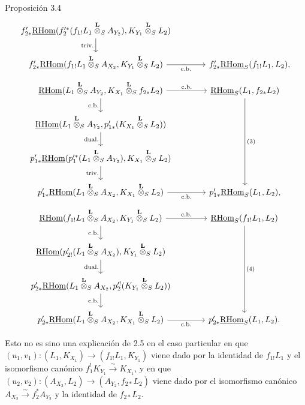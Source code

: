 \begin{statement}{Proposición 3.4}
\[\begin{tikzcd}[column sep=3.7em,row sep=1.7em]
f'_{2*}\uRHom(f_2'^*(f_{1!}L_1\overset{\mathbf L}{\otimes}_S A_{Y_2}),K_{Y_1}\overset{\mathbf L}{\otimes}_S L_2) \arrow[d,"\mathrm{triv.}"']
& \\
f'_{2*}\uRHom(f_{1!}L_1\overset{\mathbf L}{\otimes}_S A_{X_2},K_{Y_1}\overset{\mathbf L}{\otimes}_S L_2) \arrow[r,"\mathrm{c.b.}"']
& f'_{2*}\uRHom_S(f_{1!}L_1,L_2),
\end{tikzcd}
\]
\[
\begin{tikzcd}[column sep=3.7em,row sep=1.7em]
\uRHom(L_1\overset{\mathbf L}{\otimes}_S A_{Y_2},K_{X_1}\overset{\mathbf L}{\otimes}_S f_{2*}L_2)
  \arrow[r,"\mathrm{c.b.}"] \arrow[d,"\mathrm{c.b.}"']
& \uRHom_S(L_1,f_{2*}L_2) \arrow[ddd,"(3)"] \\
\uRHom(L_1\overset{\mathbf L}{\otimes}_S A_{Y_2},p'_{1*}(K_{X_1}\overset{\mathbf L}{\otimes}_S L_2)) \arrow[d,"\mathrm{dual.}"']
& \\
p'_{1*}\uRHom(p_1'^*(L_1\overset{\mathbf L}{\otimes}_S A_{Y_2}),K_{X_1}\overset{\mathbf L}{\otimes}_S L_2) \arrow[d,"\mathrm{triv.}"']
& \\
p'_{1*}\uRHom(L_1\overset{\mathbf L}{\otimes}_S A_{X_2},K_{X_1}\overset{\mathbf L}{\otimes}_S L_2) \arrow[r,"\mathrm{c.b.}"']
& p'_{1*}\uRHom_S(L_1,L_2),
\end{tikzcd}
\]
\[
\begin{tikzcd}[column sep=3.7em,row sep=1.7em]
\uRHom(f_{1!}L_1\overset{\mathbf L}{\otimes}_S A_{X_2},K_{Y_1}\overset{\mathbf L}{\otimes}_S L_2)
  \arrow[r,"\mathrm{c.b.}"] \arrow[d,"\mathrm{c.b.}"']
& \uRHom_S(f_{1!}L_1,L_2) \arrow[ddd,"(4)"] \\
\uRHom(p'_{2!}(L_1\overset{\mathbf L}{\otimes}_S A_{X_2}),K_{Y_1}\overset{\mathbf L}{\otimes}_S L_2) \arrow[d,"\mathrm{dual.}"']
& \\
p'_{2*}\uRHom(L_1\overset{\mathbf L}{\otimes}_S A_{X_2},p_2'^!(K_{Y_1}\overset{\mathbf L}{\otimes}_S L_2)) \arrow[d,"\mathrm{c.b.}"']
& \\
p'_{2*}\uRHom(L_1\overset{\mathbf L}{\otimes}_S A_{X_2},K_{X_1}\overset{\mathbf L}{\otimes}_S L_2) \arrow[r,"\mathrm{c.b.}"']
& p'_{2*}\uRHom_S(L_1,L_2).
\end{tikzcd}
\]
\end{statement}
Esto no es sino una explicación de 2.5 en el caso particular en que $(u_1,v_1):(L_1,K_{X_1})\to(f_{1!}L_1,K_{Y_1})$ viene dado por la identidad de $f_{1!}L_1$ y el isomorfismo canónico $f_1^!K_{Y_1}\xrightarrow{\sim}K_{X_1}$, y en que $(u_2,v_2):(A_{X_2},L_2)\to(A_{Y_2},f_{2*}L_2)$ viene dado por el isomorfismo canónico $A_{X_2}\xrightarrow{\sim}f_2^*A_{Y_2}$ y la identidad de $f_{2*}L_2$.

